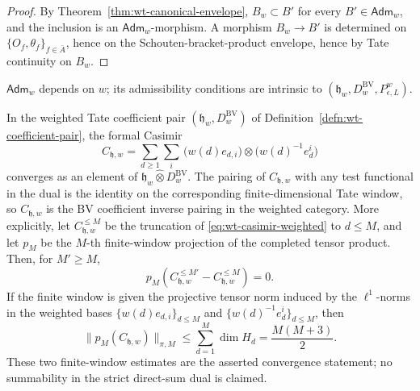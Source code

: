 \begin{proof}
  By Theorem~\ref{thm:wt-canonical-envelope}, $B_w\subset B'$ for every
  $B'\in\mathsf{Adm}_w$, and the inclusion is an
  $\mathsf{Adm}_w$-morphism.  A morphism $B_w\to B'$ is determined on
  $\{O_f,\theta_f\}_{f\in\bar A}$, hence on the
  Schouten-bracket-product envelope, hence by Tate continuity on
  $B_w$.
\end{proof}

\begin{rmk}\label{rmk:wt-canonical-as-initiality}
  $\mathsf{Adm}_w$ depends on $w$; its admissibility conditions are
  intrinsic to $(\mathfrak h_w,D^{\mathrm{BV}}_w,
  P^w_{\epsilon,L})$.
\end{rmk}

\begin{prop}\label{prop:wt-casimir-convergence}
  In the weighted Tate coefficient pair
  $(\mathfrak h_w,D^{\mathrm{BV}}_w)$ of
  Definition~\ref{defn:wt-coefficient-pair}, the formal Casimir
  \begin{equation}\label{eq:wt-casimir-weighted}
    C_{\mathfrak h,w}=\sum_{d\geq1}\sum_i\,
      \bigl(w(d)e_{d,i}\bigr)\otimes
      \bigl(w(d)^{-1}e^i_d\bigr)
  \end{equation}
  converges as an element of
  $\mathfrak h_w\widehat\otimes
  D^{\mathrm{BV}}_w$. The pairing of
  $C_{\mathfrak h,w}$ with any test functional in the dual is the
  identity on the corresponding finite-dimensional Tate window, so
  $C_{\mathfrak h,w}$ is the BV coefficient inverse pairing in the
  weighted category.  More explicitly, let
  \(C_{\mathfrak h,w}^{\leq M}\) be the truncation of
  \eqref{eq:wt-casimir-weighted} to \(d\leq M\), and let \(p_M\) be the
  \(M\)-th finite-window projection of the completed tensor product.
  Then, for \(M'\geq M\),
  \[
    p_M(C_{\mathfrak h,w}^{\leq M'}-C_{\mathfrak h,w}^{\leq M})=0.
  \]
  If the finite window is given the projective tensor norm induced by
  the \(\ell^1\)-norms in the weighted bases
  \(\{w(d)e_{d,i}\}_{d\leq M}\) and
  \(\{w(d)^{-1}e^i_d\}_{d\leq M}\), then
  \[
    \bigl\|p_M(C_{\mathfrak h,w})\bigr\|_{\pi,M}
      \leq
    \sum_{d=1}^{M}\dim H_d
      =
    \frac{M(M+3)}{2}.
  \]
  These two finite-window estimates are the asserted convergence
  statement; no summability in the strict direct-sum dual is claimed.
\end{prop}

